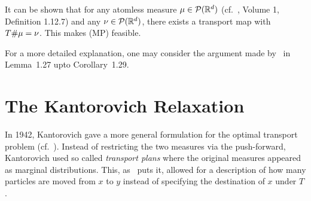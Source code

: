 




\begin{remark}\label{TransMapExist}
	It can be shown that for any atomless measure $\mu \in \mathcal{P}(\mathbb{R}^d)$ (cf.\ \cite{Bog2007}, Volume 1, Definition 1.12.7) and any $\nu \in \mathcal{P}(\mathbb{R}^d)$, there exists a transport map  with ${T} \# \mu = \nu$. This makes (MP) feasible.

	For a more detailed explanation, one may consider the argument made by~\cite{San2015} in Lemma~1.27 upto Corollary~1.29.
\end{remark}

\section{The Kantorovich Relaxation}\label{KantRelax}
In 1942, Kantorovich gave a more general formulation for the optimal transport problem (cf.~\cite{Kan1942}). Instead of restricting the two measures via the push-forward, Kantorovich used so called \textit{transport plans} where the original measures appeared as marginal distributions. This, as~\cite{San2015} puts it,  allowed for a description of how many particles are moved from $x$ to $y$ instead of specifying the destination of $x$ under $T$.

